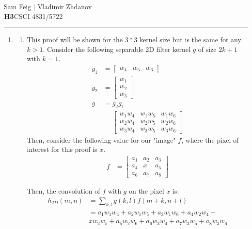 \documentclass[12pt]{article}
\begin{document}
\hfill Sam Feig $|$ Vladimir Zhdanov \\
\textbf{H3}\hfill CSCI 4831/5722 \\
\rule{\textwidth}{.75pt}

\begin{enumerate}
	\item 
	\begin{enumerate}
		\item This proof will be shown for the $3*3$ kernel size but is the same for any $k > 1$. Consider the following separable 2D filter kernel $g$ of size $2k + 1$ with $k = 1$.
		\begin{align*}
		g_1 &= \begin{bmatrix} w_4 & w_5 & w_6 \end{bmatrix} \\
		g_2 &= \begin{bmatrix} w_1 \\ w_2 \\ w_3 \end{bmatrix} \\
		g &= g_2g_1 \\  
		&= \begin{bmatrix}
		w_1w_4 & w_1w_5 & w_1w_6 \\
		w_2w_4 & w_2w_5 & w_2w_6 \\
		w_3w_4 & w_3w_5 & w_3w_6 
		\end{bmatrix}
		\end{align*}
		Then, consider the following value for our "image" $f$, where the pixel of interest for this proof is $x$.
		\begin{align*}
		f &= \begin{bmatrix}
		a_1 & a_2 & a_3 \\
		a_4 & x & a_5 \\
		a_6 & a_7 & a_8 
		\end{bmatrix}
		\end{align*}
		
		Then, the convolution of $f$ with $g$ on the pixel $x$ is:
		\begin{align*}
		h_{2D}(m, n) &= \sum_{k, l} g(k, l) f(m + k, n + l) \\
		&= a_1w_1w_4 + a_2w_1w_5 + a_3w_1w_6 + a_4w_2w_4 + \\ &xw_2w_5 + a_5w_2w_6 + a_6w_3w_4 + a_7w_3w_5 + a_8w_3w_6
		\end{align*}
		

\end{enumerate}
\end{enumerate}
\end{document}
